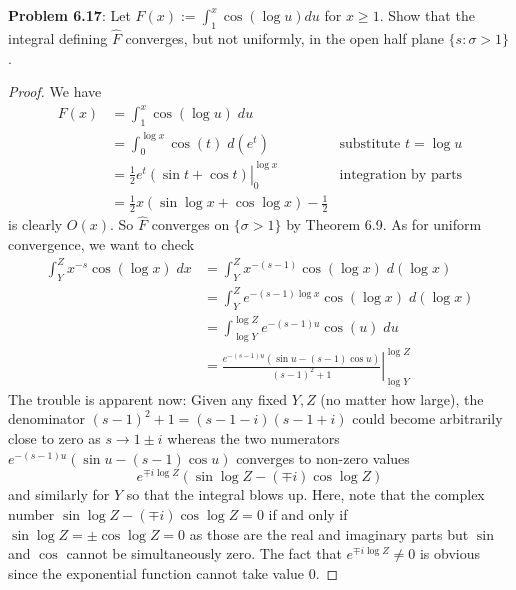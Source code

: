 \documentclass[12pt]{article}
\newcommand{\Fhat}{\widehat{F}}
\begin{document}
\textbf{Problem 6.17}: Let $F(x) := \int_1^x \cos(\log u) du$ for $x \geq 1$. Show that the integral defining $\Fhat$ converges, but not uniformly, in the open half plane $\{s : \sigma > 1\}$.

\begin{proof}
We have
\begin{align*}
F(x) &= \int_1^x \cos(\log u) \; du\\
&= \int_0^{\log x} \cos(t) \; d(e^t) &\text{substitute } t = \log u\\
&= \left. \frac{1}{2} e^t (\sin t + \cos t) \right|_0^{\log x} &\text{integration by parts}\\
&= \frac{1}{2} x (\sin \log x + \cos \log x) - \frac{1}{2}
\end{align*}
is clearly $O(x)$. So $\Fhat$ converges on $\{\sigma > 1\}$ by Theorem 6.9. As for uniform convergence, we want to check
\begin{align*}
\int_Y^Z x^{-s} \cos(\log x) \; dx &= \int_Y^Z x^{-(s-1)} \cos(\log x) \; d(\log x)\\
&= \int_Y^Z e^{- (s-1) \log x} \cos(\log x) \; d(\log x)\\
&= \int_{\log Y}^{\log Z} e^{- (s-1) u} \cos(u) \; du\\
&= \left. \frac{e^{-(s-1)u} (\sin u - (s - 1) \cos u)}{(s-1)^2 + 1} \right|_{\log Y}^{\log Z}
\end{align*}
The trouble is apparent now: Given any fixed $Y, Z$ (no matter how large), the denominator $(s-1)^2 + 1 = (s - 1 - i) (s - 1 + i)$ could become arbitrarily close to zero as $s \rightarrow 1 \pm i$ whereas the two numerators $e^{-(s-1)u} (\sin u - (s - 1) \cos u)$ converges to non-zero values
$$e^{\mp i \log Z} (\sin \log Z - (\mp i) \cos \log Z)$$
and similarly for $Y$ so that the integral blows up. Here, note that the complex number $\sin \log Z - (\mp i) \cos \log Z = 0$ if and only if $\sin \log Z = \pm \cos \log Z = 0$ as those are the real and imaginary parts but $\sin$ and $\cos$ cannot be simultaneously zero. The fact that $e^{\mp i \log Z} \not= 0$ is obvious since the exponential function cannot take value 0.
\end{proof}

\unless\ifdefined\IsMainDocument
\end{document}
